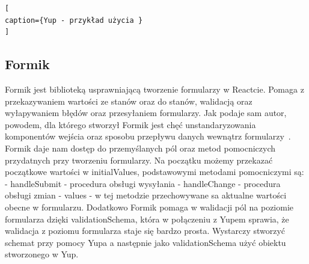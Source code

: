 \documentclass[oneside,polski,logo,indent]{amuthesis}
\begin{document}
\begin{enumerate}
\begin{enumerate}
\begin{lstlisting}[
caption={Yup - przykład użycia }
]
\end{lstlisting}


\subsection{Formik}
Formik jest biblioteką usprawniającą tworzenie formularzy w Reactcie. Pomaga z przekazywaniem wartości ze stanów oraz do stanów, walidacją oraz wyłapywaniem błędów oraz przesyłaniem formularzy.
Jak podaje sam autor, powodem, dla którego stworzył Formik jest chęć unstandaryzowania komponentów wejścia oraz sposobu przepływu danych wewnątrz formularzy~\cite{formik}.
\newline
Formik daje nam dostęp do przemyślanych pól oraz metod pomocniczych przydatnych przy tworzeniu formularzy. Na początku możemy przekazać
początkowe wartości w initialValues, podstawowymi metodami pomocniczymi są:
\newline
- handleSubmit - procedura obsługi wysyłania
\newline
- handleChange - procedura obsługi zmian
\newline
- values - w tej metodzie przechowywane sa aktualne wartości obecne w formularzu.
\newline
Dodatkowo Formik pomaga w walidacji pól na poziomie formularza dzięki validationSchema, która w połączeniu z Yupem sprawia, że walidacja z poziomu formularza staje się
bardzo prosta. Wystarczy stworzyć schemat przy pomocy Yupa a następnie jako validationSchema użyć obiektu stworzonego w Yup.



\end{enumerate}
\end{enumerate}
\end{document}
